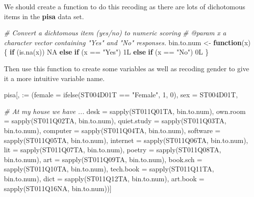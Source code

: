 \documentclass[
]{book}
\newenvironment{Shaded}{\begin{snugshade}}{\end{snugshade}}
\newcommand{\AttributeTok}[1]{\textcolor[rgb]{0.77,0.63,0.00}{#1}}
\newcommand{\CommentTok}[1]{\textcolor[rgb]{0.56,0.35,0.01}{\textit{#1}}}
\newcommand{\ConstantTok}[1]{\textcolor[rgb]{0.00,0.00,0.00}{#1}}
\newcommand{\ControlFlowTok}[1]{\textcolor[rgb]{0.13,0.29,0.53}{\textbf{#1}}}
\newcommand{\DecValTok}[1]{\textcolor[rgb]{0.00,0.00,0.81}{#1}}
\newcommand{\FunctionTok}[1]{\textcolor[rgb]{0.00,0.00,0.00}{#1}}
\newcommand{\NormalTok}[1]{#1}
\newcommand{\OtherTok}[1]{\textcolor[rgb]{0.56,0.35,0.01}{#1}}
\newcommand{\SpecialCharTok}[1]{\textcolor[rgb]{0.00,0.00,0.00}{#1}}
\newcommand{\StringTok}[1]{\textcolor[rgb]{0.31,0.60,0.02}{#1}}
\begin{document}
We should create a function to do this recoding as there are lots of dichotomous items in the \textbf{pisa} data set.

\begin{Shaded}
\begin{Highlighting}[]
\CommentTok{\#\textquotesingle{} Convert a dichtomous item (yes/no) to numeric scoring}
\CommentTok{\#\textquotesingle{} @param x a character vector containing "Yes" and "No" responses.}
\NormalTok{bin.to.num }\OtherTok{\textless{}{-}} \ControlFlowTok{function}\NormalTok{(x)\{}
  \ControlFlowTok{if}\NormalTok{ (}\FunctionTok{is.na}\NormalTok{(x)) }\ConstantTok{NA}
  \ControlFlowTok{else} \ControlFlowTok{if}\NormalTok{ (x }\SpecialCharTok{==} \StringTok{"Yes"}\NormalTok{) 1L}
  \ControlFlowTok{else} \ControlFlowTok{if}\NormalTok{ (x }\SpecialCharTok{==} \StringTok{"No"}\NormalTok{) 0L}
\NormalTok{\}}
\end{Highlighting}
\end{Shaded}

Then use this function to create some variables as well as recoding gender to give it a more intuitive variable name.

\begin{Shaded}
\begin{Highlighting}[]
\NormalTok{pisa[, }\StringTok{\textasciigrave{}}\AttributeTok{:=}\StringTok{\textasciigrave{}} 
\NormalTok{     (}\AttributeTok{female =} \FunctionTok{ifelse}\NormalTok{(ST004D01T }\SpecialCharTok{==} \StringTok{"Female"}\NormalTok{, }\DecValTok{1}\NormalTok{, }\DecValTok{0}\NormalTok{),}
       \AttributeTok{sex =}\NormalTok{ ST004D01T,}
       
       \CommentTok{\# At my house we have ...}
       \AttributeTok{desk =} \FunctionTok{sapply}\NormalTok{(ST011Q01TA, bin.to.num),}
       \AttributeTok{own.room =} \FunctionTok{sapply}\NormalTok{(ST011Q02TA, bin.to.num),}
       \AttributeTok{quiet.study =} \FunctionTok{sapply}\NormalTok{(ST011Q03TA, bin.to.num),}
       \AttributeTok{computer =} \FunctionTok{sapply}\NormalTok{(ST011Q04TA, bin.to.num),}
       \AttributeTok{software =} \FunctionTok{sapply}\NormalTok{(ST011Q05TA, bin.to.num),}
       \AttributeTok{internet =} \FunctionTok{sapply}\NormalTok{(ST011Q06TA, bin.to.num),}
       \AttributeTok{lit =} \FunctionTok{sapply}\NormalTok{(ST011Q07TA, bin.to.num),}
       \AttributeTok{poetry =} \FunctionTok{sapply}\NormalTok{(ST011Q08TA, bin.to.num),}
       \AttributeTok{art =} \FunctionTok{sapply}\NormalTok{(ST011Q09TA, bin.to.num),}
       \AttributeTok{book.sch =} \FunctionTok{sapply}\NormalTok{(ST011Q10TA, bin.to.num),}
       \AttributeTok{tech.book =} \FunctionTok{sapply}\NormalTok{(ST011Q11TA, bin.to.num),}
       \AttributeTok{dict =} \FunctionTok{sapply}\NormalTok{(ST011Q12TA, bin.to.num),}
       \AttributeTok{art.book =} \FunctionTok{sapply}\NormalTok{(ST011Q16NA, bin.to.num))]}
\end{Highlighting}
\end{Shaded}
\end{document}
